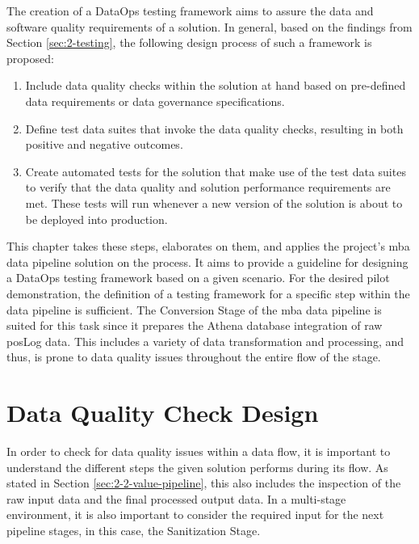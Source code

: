 
The creation of a DataOps testing framework aims to assure the data and software quality requirements of a solution. In general, based on the findings from Section \ref{sec:2-testing}, the following design process of such a framework is proposed:

\begin{enumerate}
	\item Include data quality checks within the solution at hand based on pre-defined data requirements or data governance specifications.
	\item Define test data suites that invoke the data quality checks, resulting in both positive and negative outcomes.
	\item Create automated tests for the solution that make use of the test data suites to verify that the data quality and solution performance requirements are met. These tests will run whenever a new version of the solution is about to be deployed into production.
\end{enumerate}

This chapter takes these steps, elaborates on them, and applies the project's \ac{mba} data pipeline solution on the process. It aims to provide a guideline for designing a DataOps testing framework based on a given scenario. For the desired pilot demonstration, the definition of a testing framework for a specific step within the data pipeline is sufficient. The Conversion Stage of the \ac{mba} data pipeline is suited for this task since it prepares the Athena database integration of raw \ac{pos}Log data. This includes a variety of data transformation and processing, and thus, is prone to data quality issues throughout the entire flow of the stage.

\section{Data Quality Check Design}
In order to check for data quality issues within a data flow, it is important to understand the different steps the given solution performs during its flow. As stated in Section \ref{sec:2-2-value-pipeline}, this also includes the inspection of the raw input data and the final processed output data. In a multi-stage environment, it is also important to consider the required input for the next pipeline stages, in this case, the Sanitization Stage.

